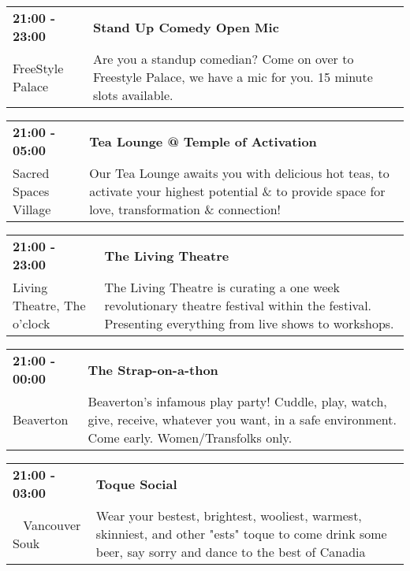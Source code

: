 \begin{tabular}{ p{1in} p{2.2in} }
    \textbf{21:00 - 23:00} & \textbf{Stand Up Comedy Open Mic} \\
    FreeStyle Palace \newline  & Are you a standup comedian?  Come on over to Freestyle Palace, we have a mic for you. 15 minute slots available. \\
    \hline 
\end{tabular}
    
\begin{tabular}{ p{1in} p{2.2in} }
    \textbf{21:00 - 05:00} & \textbf{Tea Lounge @ Temple of Activation } \\
    Sacred Spaces Village \newline  & Our Tea Lounge awaits you with delicious hot teas, to activate your highest potential \& to provide space for love, transformation \& connection! \\
    \hline 
\end{tabular}
    
\begin{tabular}{ p{1in} p{2.2in} }
    \textbf{21:00 - 23:00} & \textbf{The Living Theatre} \\
    Living Theatre, The \newline 6 o'clock & The Living Theatre is curating a one week revolutionary theatre festival within the festival. Presenting everything from live shows to workshops. \\
    \hline 
\end{tabular}
    
\begin{tabular}{ p{1in} p{2.2in} }
    \textbf{21:00 - 00:00} & \textbf{The Strap-on-a-thon} \\
    Beaverton \newline  & Beaverton's infamous play party! Cuddle, play, watch, give, receive, whatever you want, in a safe environment. Come early. Women/Transfolks only. \\
    \hline 
\end{tabular}
    
\begin{tabular}{ p{1in} p{2.2in} }
    \textbf{21:00 - 03:00} & \textbf{Toque Social} \\
    ~ \newline Vancouver Souk & Wear your bestest, brightest, wooliest, warmest, skinniest, and other "ests" toque to come drink some beer, say sorry and dance to the best of Canadia \\
    \hline 
\end{tabular}
    
